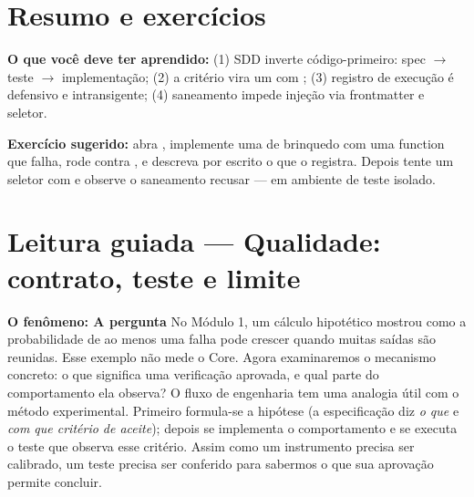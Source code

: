 \section{Resumo e exercícios}

\begin{resultado}
\textbf{O que você deve ter aprendido:} (1) SDD inverte código-primeiro:
spec $\to$ teste $\to$ implementação; (2) a critério vira um
 com ; (3) registro de execução é
defensivo e intransigente; (4) saneamento impede injeção via frontmatter e
seletor.\par\smallskip
\textbf{Exercício sugerido:} abra , implemente uma
 de brinquedo com uma function  que falha,
rode  contra , e descreva por
escrito o que o  registra. Depois tente um seletor
com  e observe o saneamento recusar — em ambiente de teste isolado.
\end{resultado}



\section[Leitura guiada]{Leitura guiada — Qualidade: contrato, teste e limite}


\begin{descricao}
\textbf{O fenômeno: A pergunta}  No Módulo 1, um cálculo hipotético mostrou como a
probabilidade de ao menos uma falha pode crescer quando muitas saídas são
reunidas. Esse exemplo não mede o Core. Agora examinaremos o mecanismo concreto:
o que significa uma verificação aprovada, e qual parte do comportamento ela
observa? O fluxo de engenharia tem uma analogia útil com o método experimental.
Primeiro formula-se a hipótese (a especificação diz \emph{o que} e \emph{com que
critério de aceite}); depois se implementa o comportamento e se executa o teste
que observa esse critério. Assim como um instrumento precisa ser calibrado, um
teste precisa ser conferido para sabermos o que sua aprovação permite concluir.
\end{descricao}

